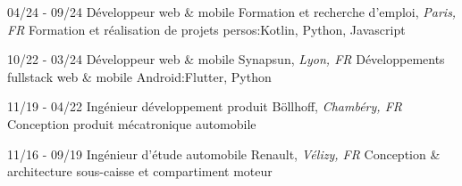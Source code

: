 \documentclass[]{friggeri-cv}
\begin{document}
\begin{entrylist}
  \entry
    {04/24 - 09/24}
    {Développeur web \& mobile}
    {Formation et recherche d'emploi, \textit{Paris, FR}}
    {Formation et réalisation de projets persos:\hspace*{8mm}Kotlin, Python, Javascript}
\end{entrylist}

\begin{entrylist}
  \entry
    {10/22 - 03/24}
    {Développeur web \& mobile}
    {Synapsun, \textit{Lyon, FR}}
    {Développements fullstack web \& mobile Android:\hspace*{8mm}Flutter, Python}
\end{entrylist}

\begin{entrylist}
  \entry
    {11/19 - 04/22}
    {Ingénieur développement produit}
    {Böllhoff, \textit{Chambéry, FR}}
    {Conception produit mécatronique automobile}
\end{entrylist}

\begin{entrylist}
  \entry
    {11/16 - 09/19}
    {Ingénieur d'étude automobile}
    {Renault, \textit{Vélizy, FR}}
    {Conception \& architecture sous-caisse et compartiment moteur}
\end{entrylist}

\vspace*{-0.5cm}
\vspace*{0.45cm}
\end{document}
